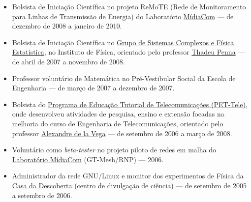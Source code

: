 \documentclass[a4paper,11pt]{article}
\begin{document}
	\begin{itemize}
		\item Bolsista de Iniciação Científica no projeto ReMoTE (Rede de
			Monitoramento para Linhas de Transmissão de Energia) do Laboratório
			\href{http://www.midiacom.uff.br/ }{MídiaCom} --- de dezembro de
			2008 a janeiro de 2010.
		\item Bolsista de Iniciação Científica no
			\href{http://complex.if.uff.br/}{Grupo de Sistemas Complexos e
			Física Estatística}, no Instituto de Física, orientado pelo
			professor \href{http://profs.if.uff.br/tjpp/}{Thadeu Penna} --- de
			abril de 2007 a novembro de 2008.
		\item Professor voluntário de Matemática no Pré-Vestibular Social da
			Escola de Engenharia --- de março de 2007 a dezembro de 2007.
		\item Bolsista do \href{http://pet.telecom.uff.br/}{Programa de
			Educação Tutorial de Telecomunicações (PET-Tele)}, onde desenvolveu
			atividades de pesquisa, ensino e extensão focadas na melhoria do
			curso de Engenharia de Telecomunicações, orientado pelo professor
			\href{http://www.telecom.uff.br/~delavega/}{Alexandre de la Vega}
			--- de setembro de 2006 a março de 2008.
		\item Voluntário como \textit{beta-tester} no projeto piloto de redes
			em malha do \href{http://www.midiacom.uff.br/}{Laboratório
			MídiaCom} (GT-Mesh/RNP) --- 2006.
		\item Administrador da rede GNU/Linux e monitor dos experimentos de
			Física da \href{http://www.uff.br/casadadescoberta/}{Casa da
			Descoberta} (centro de divulgação de ciência) --- de setembro de
			2005 a setembro de 2006.
	\end{itemize}
\end{document}
